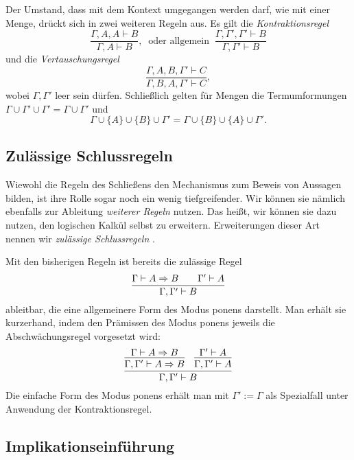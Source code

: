Der Umstand, dass mit dem Kontext umgegangen werden darf, wie mit
einer Menge, drückt sich in zwei weiteren Regeln aus. Es gilt die
\emph{Kontraktionsregel}
\[\dfrac{\Gamma,A,A\vdash B}{\Gamma,A\vdash B},\;\;
\text{oder allgemein}\;\;\dfrac{\Gamma,\Gamma',\Gamma'\vdash B}{\Gamma,\Gamma'\vdash B}\]
und die \emph{Vertauschungsregel}
\[\dfrac{\Gamma,A,B,\Gamma'\vdash C}{\Gamma,B,A,\Gamma'\vdash C},\]
wobei $\Gamma,\Gamma'$ leer sein dürfen. Schließlich gelten für Mengen
die Termumformungen
$\Gamma\cup\Gamma'\cup\Gamma' = \Gamma\cup\Gamma'$
und
\[\Gamma\cup\{A\}\cup\{B\}\cup\Gamma' = \Gamma\cup\{B\}\cup\{A\}\cup\Gamma'.\]


\subsection{Zulässige Schlussregeln}

Wiewohl die Regeln des Schließens den Mechanismus zum Beweis
von Aussagen bilden, ist ihre Rolle sogar noch ein wenig tiefgreifender.
Wir können sie nämlich ebenfalls zur Ableitung \emph{weiterer Regeln}
nutzen. Das heißt, wir können sie dazu nutzen, den logischen Kalkül
selbst zu erweitern. Erweiterungen dieser Art nennen wir
\emph{zulässige Schlussregeln}%
.

Mit den bisherigen Regeln ist bereits die zulässige Regel
\[\dfrac{\Gamma\vdash A\Rightarrow B\qquad\Gamma'\vdash A}
{\Gamma,\Gamma'\vdash B}\]
ableitbar, die eine allgemeinere Form des Modus ponens darstellt. Man
erhält sie kurzerhand, indem den Prämissen des Modus
ponens jeweils die Abschwächungsregel vorgesetzt wird:
\[\infer{\Gamma,\Gamma'\vdash B}{
  \infer{\Gamma,\Gamma'\vdash A\cond B}{\Gamma\vdash A\cond B}
& \infer{\Gamma,\Gamma'\vdash A}{\Gamma'\vdash A}}
\]
Die einfache Form des Modus ponens erhält man mit $\Gamma':=\Gamma$ als
Spezialfall unter Anwendung der Kontraktionsregel.

\subsection{Implikationseinführung}

